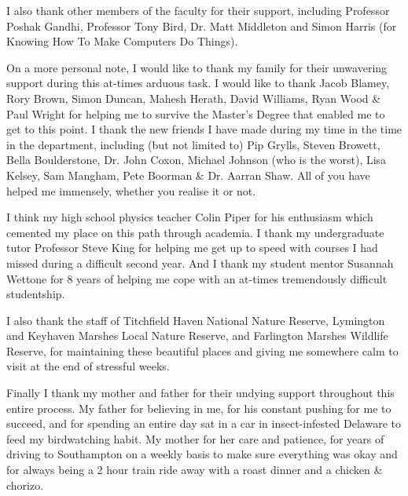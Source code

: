 \par I also thank other members of the faculty for their support, including Professor Poshak Gandhi, Professor Tony Bird, Dr. Matt Middleton and Simon Harris (for Knowing How To Make Computers Do Things).
\par On a more personal note, I would like to thank my family for their unwavering support during this at-times arduous task.  I would like to thank Jacob Blamey, Rory Brown, Simon Duncan, Mahesh Herath, David Williams, Ryan Wood \& Paul Wright for helping me to survive the Master's Degree that enabled me to get to this point.  I thank the new friends I have made during my time in the time in the department, including (but not limited to) Pip Grylls, Steven Browett, Bella Boulderstone, Dr. John Coxon, Michael Johnson (who is the worst), Lisa Kelsey, Sam Mangham, Pete Boorman \& Dr. Aarran Shaw.  All of you have helped me immensely, whether you realise it or not.
\par I think my high school physics teacher Colin Piper for his enthusiasm which cemented my place on this path through academia.  I thank my undergraduate tutor Professor Steve King for helping me get up to speed with courses I had missed during a difficult second year.  And I thank my student mentor Susannah Wettone for 8 years of helping me cope with an at-times tremendously difficult studentship.
\par I also thank the staff of Titchfield Haven National Nature Reserve, Lymington and Keyhaven Marshes Local Nature Reserve, and Farlington Marshes Wildlife Reserve, for maintaining these beautiful places and giving me somewhere calm to visit at the end of stressful weeks.
\par Finally I thank my mother and father for their undying support throughout this entire process.  My father for believing in me, for his constant pushing for me to succeed, and for spending an entire day sat in a car in insect-infested Delaware to feed my birdwatching habit.  My mother for her care and patience, for years of driving to Southampton on a weekly basis to make sure everything was okay and for always being a 2 hour train ride away with a roast dinner and a chicken \& chorizo.